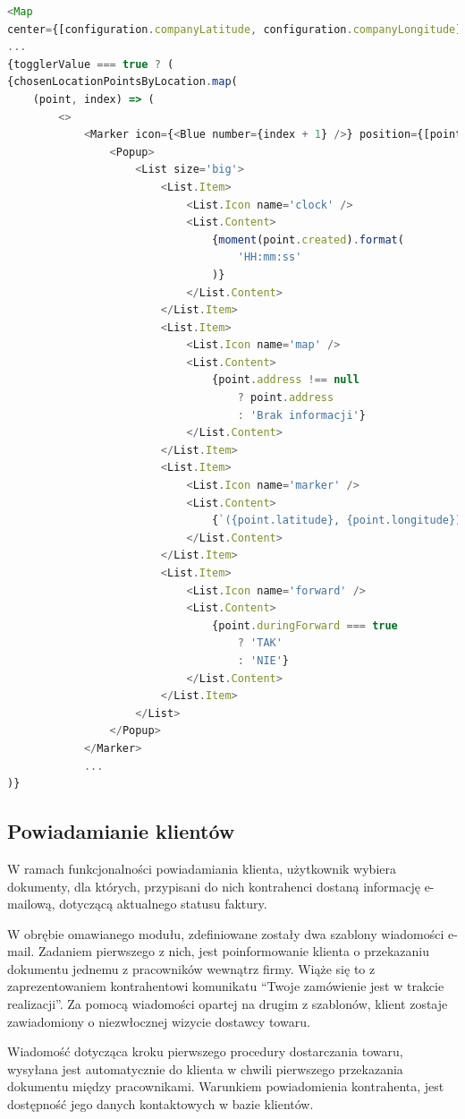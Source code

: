 \begin{lstlisting}[label=lst:component-map,caption=Kod komponentu wyświetlającego mapę oraz znaczniki lokalizacji, captionpos=b,basicstyle=\footnotesize\ttfamily,language=JavaScript]
<Map
center={[configuration.companyLatitude, configuration.companyLongitude]}>
...
{togglerValue === true ? (
{chosenLocationPointsByLocation.map(
	(point, index) => (
		<>
			<Marker icon={<Blue number={index + 1} />} position={[point.latitude, point.longitude]}>
				<Popup>
					<List size='big'>
						<List.Item>
							<List.Icon name='clock' />
							<List.Content>
								{moment(point.created).format(
									'HH:mm:ss'
								)}
							</List.Content>
						</List.Item>
						<List.Item>
							<List.Icon name='map' />
							<List.Content>
								{point.address !== null
									? point.address
									: 'Brak informacji'}
							</List.Content>
						</List.Item>
						<List.Item>
							<List.Icon name='marker' />
							<List.Content>
								{`({point.latitude}, {point.longitude})`}
							</List.Content>
						</List.Item>
						<List.Item>
							<List.Icon name='forward' />
							<List.Content>
								{point.duringForward === true
									? 'TAK'
									: 'NIE'}
							</List.Content>
						</List.Item>
					</List>
				</Popup>
			</Marker>
			...
)}
\end{lstlisting}

\subsection{Powiadamianie klientów}
W ramach funkcjonalności powiadamiania klienta, użytkownik wybiera dokumenty, dla których, przypisani do nich kontrahenci dostaną informację e-mailową, dotyczącą aktualnego statusu faktury.

W obrębie omawianego modułu, zdefiniowane zostały dwa szablony wiadomości e-mail. Zadaniem pierwszego z nich, jest poinformowanie klienta o przekazaniu dokumentu jednemu z pracowników wewnątrz firmy. Wiąże się to z zaprezentowaniem kontrahentowi komunikatu "`Twoje zamówienie jest w trakcie realizacji"'. Za pomocą wiadomości opartej na drugim z szablonów, klient zostaje zawiadomiony o niezwłocznej wizycie dostawcy towaru.

Wiadomość dotycząca kroku pierwszego procedury dostarczania towaru, wysyłana jest automatycznie do klienta w chwili pierwszego przekazania dokumentu między pracownikami. Warunkiem powiadomienia kontrahenta, jest dostępność jego danych kontaktowych w bazie klientów.

